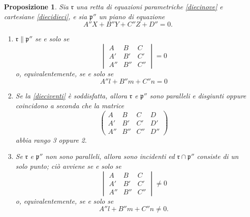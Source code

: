 \documentclass{article}
\theoremstyle{plain}
\newtheorem{prop}[thm]{Proposizione}
\theoremstyle{definition}
\theoremstyle{remark}
\begin{document}
\begin{bxthm}
\begin{prop}\label{riecrui}
Sia $\mathfrak{r}$ una retta di equazioni parametriche \ref{diecinove} e cartesiane \ref{diecidieci}, e sia 
$\mathfrak{p}''$ un piano di equazione
\begin{equation}\label{diecidiciannove}
A''X + B''Y + C''Z + D'' = 0.
\end{equation}
\begin{enumerate}
\item $\mathfrak{r} \parallel \mathfrak{p}''$ se e solo se
\begin{equation}\label{dieciventi}
\begin{vmatrix}
A & B & C \\
A' & B' & C' \\
A'' & B'' & C'' 
\end{vmatrix} = 0 
\end{equation}
o, equivalentemente, se e solo se 
\begin{equation}\label{dieciventuno}
    A''l+B''m+C''n=0
\end{equation}
\item Se la \ref{dieciventi} è soddisfatta, allora $\mathfrak{r}$ e $\mathfrak{p}''$ sono paralleli e disgiunti oppure coincidono a seconda che la matrice
\begin{equation}\label{dieciventidue}
\begin{pmatrix}
A & B & C & D \\
A' & B' & C' & D' \\
A'' & B'' & C'' & D''
\end{pmatrix}     
\end{equation}
abbia rango 3 oppure 2.

\item Se $\mathfrak{r}$ e $\mathfrak{p}''$ non sono paralleli, allora sono incidenti ed $\mathfrak{r} \cap \mathfrak{p}''$ consiste di un solo punto; 
ciò avviene se e solo se
\begin{equation}\label{dieciventire}
\begin{vmatrix}
A & B & C \\
A' & B' & C' \\
A'' & B'' & C''
\end{vmatrix} \neq 0    
\end{equation}
o, equivalentemente, se e solo se
\begin{equation}\label{dieciventiquattro}
A''l + B''m + C''n \neq 0.    
\end{equation}
\end{enumerate}
\end{prop}
\end{bxthm}
\end{document}

